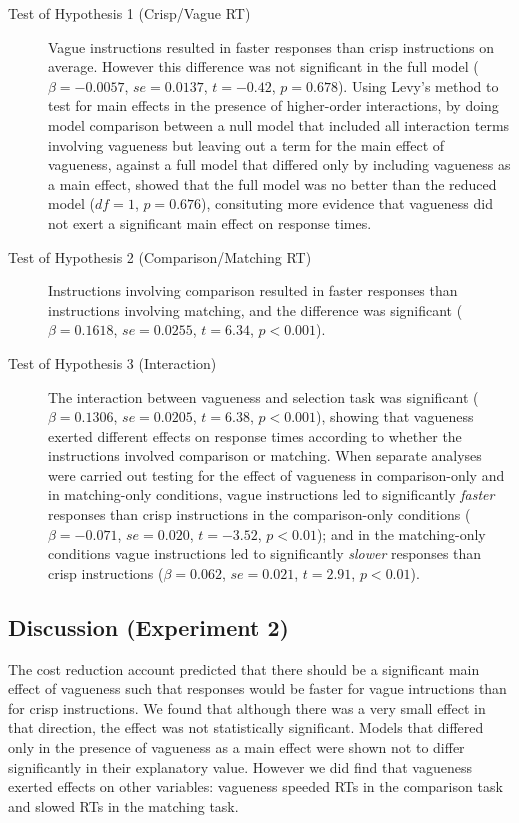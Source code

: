 \documentclass[ %
  graybox       %
 ,envcountchap  %
 ,sectrefs      %
]{svmono}
\begin{document}
\begin{description}
	\item [Test of Hypothesis 1 (Crisp/Vague RT)] Vague instructions resulted in faster responses than crisp instructions on average. However this difference was not significant in the full model ($\beta=-0.0057$, $se=0.0137$, $t=-0.42$, $p=0.678$). Using Levy's method \citep{Levy:MainEffectsInteractions} to test for main effects in the presence of higher-order interactions, by doing model comparison between a null model that included all interaction terms involving vagueness but leaving out a term for the main effect of vagueness, against a full model that differed only by including vagueness as a main effect, showed that the full model was no better than the reduced model ($df=1$, $p=0.676$), consituting more evidence that vagueness did not exert a significant main effect on response times.
	\item [Test of Hypothesis 2 (Comparison/Matching RT)] Instructions involving comparison resulted in faster responses than instructions involving matching, and the difference was significant ($\beta=0.1618$, $se=0.0255$, $t=6.34$, $p<0.001$).
	\item [Test of Hypothesis 3 (Interaction)] The interaction between vagueness and selection task was significant ($\beta=0.1306$, $se=0.0205$, $t=6.38$, $p<0.001$), showing that vagueness exerted different effects on response times according to whether the instructions involved comparison or matching. When separate analyses were carried out testing for the effect of vagueness in comparison-only and in matching-only conditions, vague instructions led to significantly \emph{faster} responses than crisp instructions in the comparison-only conditions ($\beta=-0.071$, $se=0.020$, $t=-3.52$, $p<0.01$); and in the matching-only conditions vague instructions led to significantly \emph{slower} responses than crisp instructions ($\beta=0.062$, $se=0.021$, $t=2.91$, $p<0.01$).
\end{description}

\subsection{Discussion (Experiment 2)}

The cost reduction account predicted that there should be a significant main effect of vagueness such that responses would be faster for vague intructions than for crisp instructions. We found that although there was a very small effect in that direction, the effect was not statistically significant. Models that differed only in the presence of vagueness as a main effect were shown not to differ significantly in their explanatory value. However we did find that vagueness exerted effects on other variables: vagueness speeded RTs in the comparison task and slowed RTs in the matching task.
\end{document}
